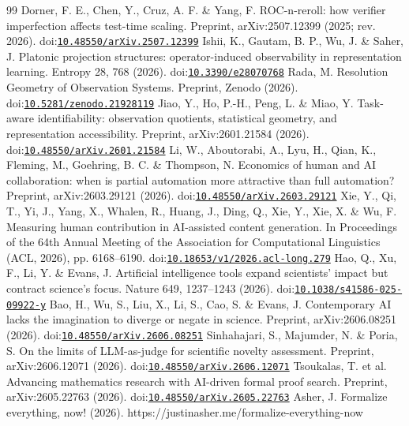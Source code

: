 \documentclass[11pt,a4paper]{article}
\theoremstyle{definition}
\theoremstyle{remark}
\begin{document}
\begin{thebibliography}{99}
 Dorner, F. E., Chen, Y., Cruz, A. F. \& Yang, F. ROC-n-reroll: how verifier imperfection affects test-time scaling. Preprint, arXiv:2507.12399 (2025; rev. 2026). doi:\href{https://doi.org/10.48550/arXiv.2507.12399}{\nolinkurl{10.48550/arXiv.2507.12399}}
 Ishii, K., Gautam, B. P., Wu, J. \& Saher, J. Platonic projection structures: operator-induced observability in representation learning. Entropy 28, 768 (2026). doi:\href{https://doi.org/10.3390/e28070768}{\nolinkurl{10.3390/e28070768}}
 Rada, M. Resolution Geometry of Observation Systems. Preprint, Zenodo (2026). doi:\href{https://doi.org/10.5281/zenodo.21928119}{\nolinkurl{10.5281/zenodo.21928119}}
 Jiao, Y., Ho, P.-H., Peng, L. \& Miao, Y. Task-aware identifiability: observation quotients, statistical geometry, and representation accessibility. Preprint, arXiv:2601.21584 (2026). doi:\href{https://doi.org/10.48550/arXiv.2601.21584}{\nolinkurl{10.48550/arXiv.2601.21584}}
 Li, W., Aboutorabi, A., Lyu, H., Qian, K., Fleming, M., Goehring, B. C. \& Thompson, N. Economics of human and AI collaboration: when is partial automation more attractive than full automation? Preprint, arXiv:2603.29121 (2026). doi:\href{https://doi.org/10.48550/arXiv.2603.29121}{\nolinkurl{10.48550/arXiv.2603.29121}}
 Xie, Y., Qi, T., Yi, J., Yang, X., Whalen, R., Huang, J., Ding, Q., Xie, Y., Xie, X. \& Wu, F. Measuring human contribution in AI-assisted content generation. In Proceedings of the 64th Annual Meeting of the Association for Computational Linguistics (ACL, 2026), pp. 6168–6190. doi:\href{https://doi.org/10.18653/v1/2026.acl-long.279}{\nolinkurl{10.18653/v1/2026.acl-long.279}}
 Hao, Q., Xu, F., Li, Y. \& Evans, J. Artificial intelligence tools expand scientists' impact but contract science's focus. Nature 649, 1237–1243 (2026). doi:\href{https://doi.org/10.1038/s41586-025-09922-y}{\nolinkurl{10.1038/s41586-025-09922-y}}
 Bao, H., Wu, S., Liu, X., Li, S., Cao, S. \& Evans, J. Contemporary AI lacks the imagination to diverge or negate in science. Preprint, arXiv:2606.08251 (2026). doi:\href{https://doi.org/10.48550/arXiv.2606.08251}{\nolinkurl{10.48550/arXiv.2606.08251}}
 Sinhahajari, S., Majumder, N. \& Poria, S. On the limits of LLM-as-judge for scientific novelty assessment. Preprint, arXiv:2606.12071 (2026). doi:\href{https://doi.org/10.48550/arXiv.2606.12071}{\nolinkurl{10.48550/arXiv.2606.12071}}
 Tsoukalas, T. et al. Advancing mathematics research with AI-driven formal proof search. Preprint, arXiv:2605.22763 (2026). doi:\href{https://doi.org/10.48550/arXiv.2605.22763}{\nolinkurl{10.48550/arXiv.2605.22763}}
 Asher, J. Formalize everything, now! (2026). https://justinasher.me/formalize-everything-now
\end{thebibliography}
\end{document}
